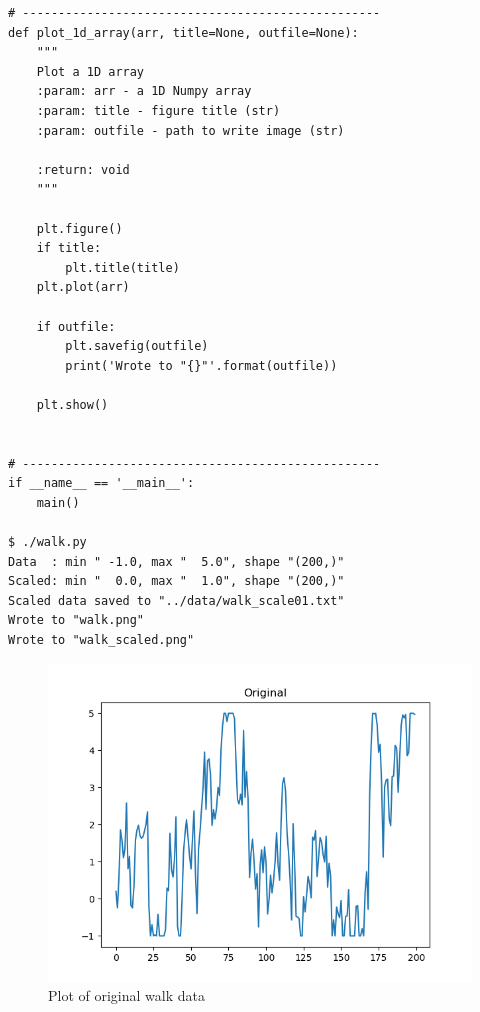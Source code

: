 \documentclass[10pt]{article}
\begin{document}
\begin{enumerate}
\begin{verbatim}
# --------------------------------------------------
def plot_1d_array(arr, title=None, outfile=None):
    """
    Plot a 1D array
    :param: arr - a 1D Numpy array
    :param: title - figure title (str)
    :param: outfile - path to write image (str)

    :return: void
    """

    plt.figure()
    if title:
        plt.title(title)
    plt.plot(arr)

    if outfile:
        plt.savefig(outfile)
        print('Wrote to "{}"'.format(outfile))

    plt.show()


# --------------------------------------------------
if __name__ == '__main__':
    main()

$ ./walk.py
Data  : min " -1.0, max "  5.0", shape "(200,)"
Scaled: min "  0.0, max "  1.0", shape "(200,)"
Scaled data saved to "../data/walk_scale01.txt"
Wrote to "walk.png"
Wrote to "walk_scaled.png"

\end{verbatim}

\begin{figure}

\centering
  \includegraphics[width=\linewidth]{code/walk.png}
 \caption{Plot of original walk data}
\label{label}

\end{figure}

\begin{figure}


\end{figure}
\end{enumerate}
\end{document}
